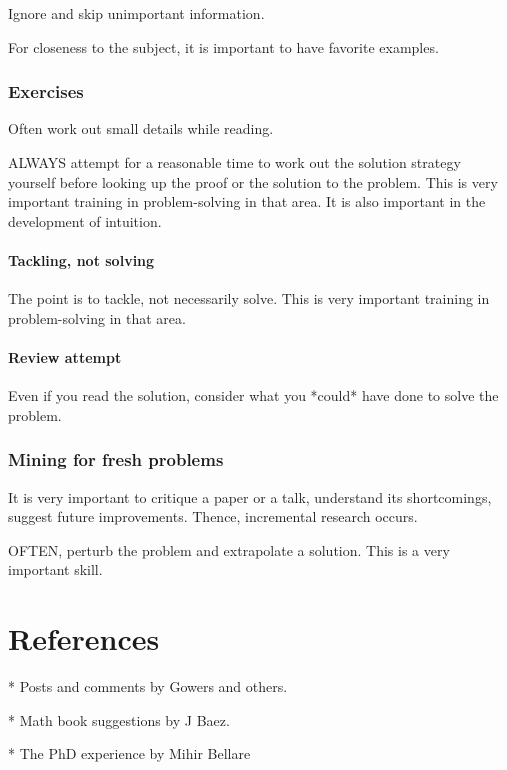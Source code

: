 \documentclass[oneside, article]{memoir}
\begin{document}
Ignore and skip unimportant information.

For closeness to the subject, it is important to have favorite examples.

\section{Exercises}
Often work out small details while reading.

ALWAYS attempt for a reasonable time to work out the solution strategy yourself before looking up the proof or the solution to the problem. This is very important training in problem-solving in that area. It is also important in the development of intuition.

\subsection{Tackling, not solving}
The point is to tackle, not necessarily solve. This is very important training in problem-solving in that area.

\subsection{Review attempt}
Even if you read the solution, consider what you *could* have done to solve the problem.

\section{Mining for fresh problems}
It is very important to critique a paper or a talk, understand its shortcomings, suggest future improvements. Thence, incremental research occurs.

OFTEN, perturb the problem and extrapolate a solution. This is a very important skill.

\part{References}
    * Posts and comments by Gowers and others.

    * Math book suggestions by J Baez.

    * The PhD experience by Mihir Bellare
\end{document}
